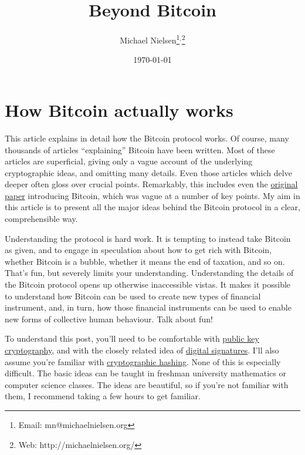 \documentclass[12pt]{book}
\newcommand{\link}[2]{\href{#1}{#2}}
\begin{document}
\title{Beyond Bitcoin}
\author{Michael Nielsen\thanks{Email: mn@michaelnielsen.org}$^{,}$\thanks{Web: http://michaelnielsen.org/}}
\date{\today}

\maketitle

\pagestyle{headings}

\tableofcontents

\chapter{How Bitcoin actually works}

%
%
This article explains in detail how the Bitcoin protocol works.  Of
course, many thousands of articles ``explaining'' Bitcoin have been
written.  Most of these articles are superficial, giving only a vague
account of the underlying cryptographic ideas, and omitting many
details.  Even those articles which delve deeper often gloss over
crucial points.  Remarkably, this includes even the
\link{http://bitcoin.org/bitcoin.pdf}{original paper} introducing
Bitcoin, which was vague at a number of key points.  My aim in this
article is to present all the major ideas behind the Bitcoin protocol
in a clear, comprehensible way.

%
%
Understanding the protocol is hard work.  It is tempting to instead
take Bitcoin as given, and to engage in speculation about how to get
rich with Bitcoin, whether Bitcoin is a bubble, whether it means the
end of taxation, and so on.  That's fun, but severely limits your
understanding.  Understanding the details of the Bitcoin protocol
opens up otherwise inaccessible vistas.  It makes it possible to
understand how Bitcoin can be used to create new types of financial
instrument, and, in turn, how those financial instruments can be used
to enable new forms of collective human behaviour.  Talk about fun!

%
%
To understand this post, you'll need to be comfortable with
\link{http://en.wikipedia.org/wiki/Public-key_cryptography}{public key
  cryptography}, and with the closely related idea of
\link{https://en.wikipedia.org/wiki/Digital_signature}{digital
  signatures}.  I'll also assume you're familiar with
\link{https://en.wikipedia.org/wiki/Cryptographic_hash_function}{cryptographic
  hashing}.  None of this is especially difficult.  The basic ideas
can be taught in freshman university mathematics or computer science
classes.  The ideas are beautiful, so if you're not familiar with
them, I recommend taking a few hours to get familiar.
\end{document}
